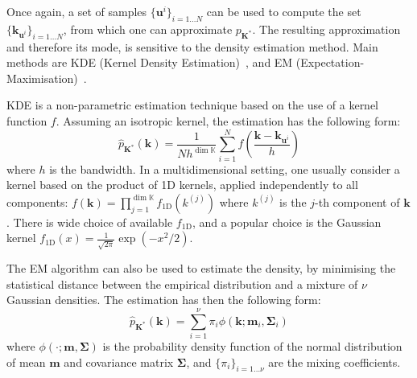 \documentclass[preprint, 1p]{elsarticle}
\newcommand{\Kspace}{\mathbb{K}}
\newcommand{\elise}[1]{{\itshape\color{red} ({#1})}}
\begin{document}
Once again, a set of samples  $\{\mathbf{u}^i\}_{i=1\dots N}$ can be used to compute the set $\{\mathbf{k}_{\mathbf{u}^i}\}_{i=1\dots N}$, from which one can 
approximate  $p_{\mathbf{K}^*}$. The resulting approximation and therefore its mode, is sensitive to the density estimation method. Main methods are KDE  (Kernel Density Estimation)~\cite{elise}, and  EM (Expectation-Maximisation)~\citep{dempster_maximum_1977}.


KDE is a non-parametric estimation technique based on the use of a kernel function $f$. Assuming an isotropic kernel, the estimation has the following form:
\begin{equation}
\hat{p}_{\mathbf{K}^*}(\mathbf{k}) = \frac{1}{Nh^{\dim \Kspace}} \sum_{i=1}^N f\left(\frac{\mathbf{k} - \mathbf{k}_{\mathbf{u}^i}}{h}\right)
\end{equation}
where $h$ is the bandwidth. In a multidimensional setting, one usually consider a kernel based on the product of 1D kernels, applied independently to all components: $f(\mathbf{k}) = \prod_{j=1}^{\dim \Kspace} f_{\mathrm{1D}} (k^{(j)})$
where $k^{(j)}$ is the $j$-th component of $\mathbf{k}$.  There is wide choice of available $f_{\mathrm{1D}}$, and a popular choice is  %
the Gaussian kernel $f_{\mathrm{1D}}(x)= \frac{1}{\sqrt{2\pi}}\exp(-x^2 / 2)$. %

The EM algorithm can also be used to estimate the density, by minimising the statistical distance between the empirical distribution and a mixture of $\nu$ Gaussian densities. The estimation has then the following form:
\begin{equation}
\hat{p}_{\mathbf{K}^*}(\mathbf{k}) = \sum_{i=1}^{\nu} \pi_i \phi(\mathbf{k}; \mathbf{m}_i, \mathbf{\Sigma}_i)
\end{equation}
where $\phi( \cdot; \mathbf{m}, \mathbf{\Sigma})$ is the probability density function of the normal distribution of mean $\mathbf{m}$ and covariance matrix $\mathbf{\Sigma}$, and $\{\pi_i \}_{i=1 \dots \nu}$ are the mixing coefficients.

\end{document}
